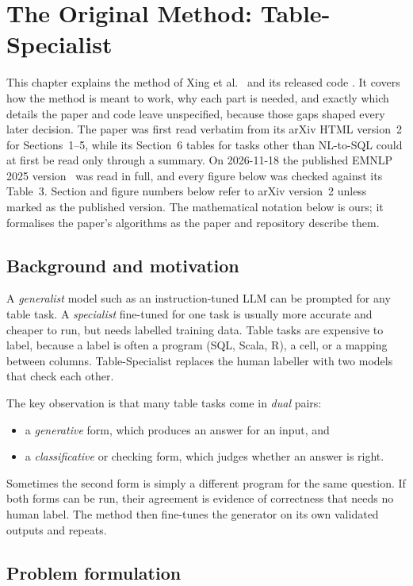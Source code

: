 \chapter{The Original Method: Table-Specialist}\label{ch:paper}

This chapter explains the method of Xing et al.~\cite{xing2024tablellmspecialist} and its released code
\cite{tablespecialistrepo}. It covers how the method is meant to work, why each part is needed, and exactly which
details the paper and code leave unspecified, because those gaps shaped every later decision. The paper was first read
verbatim from its arXiv HTML version~2 for Sections~1--5, while its Section~6 tables for tasks other than NL-to-SQL could
at first be read only through a summary. On 2026-11-18 the published EMNLP 2025 version~\cite{xing2025emnlp} was read
in full, and every figure below was checked against its Table~3. Section and figure numbers below refer to arXiv
version~2 unless marked as the published version.
The mathematical notation below is ours; it formalises the paper's algorithms as the paper and repository describe them.

\section{Background and motivation}

A \emph{generalist} model such as an instruction-tuned LLM can be prompted for any table task. A \emph{specialist}
fine-tuned for one task is usually more accurate and cheaper to run, but needs labelled training data. Table tasks are
expensive to label, because a label is often a program (SQL, Scala, R), a cell, or a mapping between columns.
Table-Specialist replaces the human labeller with two models that check each other.

The key observation is that many table tasks come in \emph{dual} pairs:
\begin{itemize}
\item a \emph{generative} form, which produces an answer for an input, and
\item a \emph{classificative} or checking form, which judges whether an answer is right.
\end{itemize}
Sometimes the second form is simply a different program for the same question. If both forms can be run, their
agreement is evidence of correctness that needs no human label. The method then fine-tunes the generator on its own
validated outputs and repeats.

\section{Problem formulation}\label{sec:formulation}

